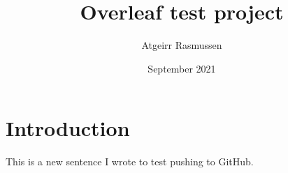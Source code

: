 \documentclass{article}
\title{Overleaf test project}
\author{Atgeirr Rasmussen}
\date{September 2021}
\begin{document}
\maketitle

\section{Introduction}

This is a new sentence I wrote to test pushing to GitHub.
\end{document}
